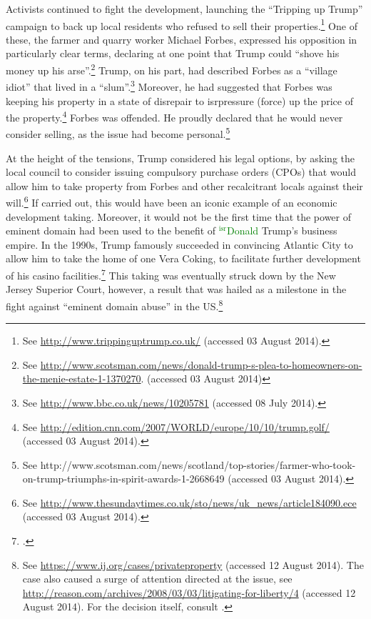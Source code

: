 \documentclass[12pt,a4paper]{book} %
\newcommand{\isr}[1]{\textcolor{green}{$^{\textrm{isr}}${#1}}}
\begin{document}
Activists continued to fight the development, launching the ``Tripping up Trump'' campaign to back up local residents who refused to sell their properties.\footnote{See \url{http://www.trippinguptrump.co.uk/} (accessed 03 August 2014).} One of these, the farmer and quarry worker Michael Forbes, expressed his opposition in particularly clear terms, declaring at one point that Trump could ``shove his money up his arse''.\footnote{See \url{http://www.scotsman.com/news/donald-trump-s-plea-to-homeowners-on-the-menie-estate-1-1370270}. (accessed 03 August 2014)} Trump, on his part, had described Forbes as a ``village idiot'' that lived in a ``slum''.\footnote{See \url{http://www.bbc.co.uk/news/10205781} (accessed 08 July 2014).} Moreover, he had suggested that Forbes was keeping his property in a state of disrepair to isr{pressure (force)} up the price of the property.\footnote{See \url{http://edition.cnn.com/2007/WORLD/europe/10/10/trump.golf/} (accessed 03 August 2014).} Forbes was offended. He proudly declared that he would never consider selling, as the issue had become personal.\footnote{See http://www.scotsman.com/news/scotland/top-stories/farmer-who-took-on-trump-triumphs-in-spirit-awards-1-2668649 (accessed 03 August 2014).}

At the height of the tensions, Trump considered his legal options, by asking the local council to consider issuing compulsory purchase orders (CPOs) that would allow him to take property from Forbes and other recalcitrant locals against their will.\footnote{See \url{http://www.thesundaytimes.co.uk/sto/news/uk_news/article184090.ece} (accessed 03 August 2014).} If carried out, this would have been an iconic example of an economic development taking. Moreover, it would not be the first time that the power of eminent domain had been used to the benefit of \isr{Donald} Trump's business empire. In the 1990s, Trump famously succeeded in convincing Atlantic City to allow him to take the home of one Vera Coking, to facilitate further development of his casino facilities.\footcite[297-301]{jones00} This taking was eventually struck down by the New Jersey Superior Court, however, a result that was hailed as a milestone in the fight against ``eminent domain abuse'' in the US.\footnote{See \url{https://www.ij.org/cases/privateproperty} (accessed 12 August 2014). The case also caused a surge of attention directed at the issue, see \url{http://reason.com/archives/2008/03/03/litigating-for-liberty/4} (accessed 12 August 2014). For the decision itself, consult \cite{banin98}.}
\end{document}
